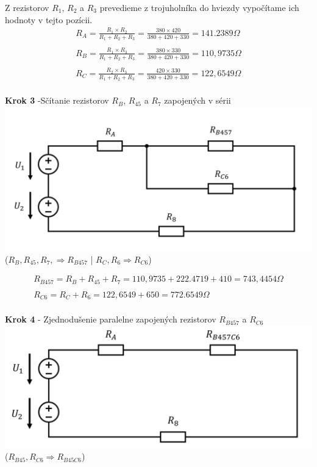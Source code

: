 \noindent Z rezistorov $R_1$, $R_2$ a $R_3$ prevedieme z trojuholníka do hviezdy vypočítame ich hodnoty v tejto pozícii.\\

\begin{gather*}
R_A = \frac{R_1 \times R_2}{R_1 + R_2 + R_3} =
\frac{380 \times 420}{380 + 420 + 330}=
141.2389 \Omega \\\\
R_B = \frac{R_1 \times R_3}{R_1 + R_2 + R_3} =
\frac{380 \times 330}{380 + 420 + 330} =
110,9735 \Omega \\\\
R_C = \frac{R_2 \times R_3}{R_1 + R_2 + R_3} =
\frac{420 \times 330}{380 + 420 + 330} =
122,6549 \Omega \\\
\end{gather*}

\begin{center}
\textbf{Krok 3} -Sčítanie rezistorov $R_B$, $R_{45}$ a $R_7$ zapojených v sérii
\includegraphics[scale=0.5,keepaspectratio]{fig/c3.png} \\
($R_B, R_45, R_7, \Rightarrow R_{B457}$ | $R_C, R_6 \Rightarrow R_{C6}$)
\end{center}

\begin{gather*}
R_{B457} = R_B + R_45 + R_7 =
110,9735 + 222.4719 + 410 =
743,4454 \Omega
\\\\
R_{C6} = R_C + R_6 =
122,6549 + 650 =
772.6549 \Omega
\\\
\end{gather*}
 
\newpage

\begin{center}
\textbf{Krok 4} - Zjednodušenie paralelne zapojených rezistorov $R_{B457}$ a $R_{C6}$ \\
\includegraphics[scale=0.5,keepaspectratio]{fig/c4.png} \\
($R_{B45}, R_{C6} \Rightarrow R_{B45C6}$)
\end{center}

